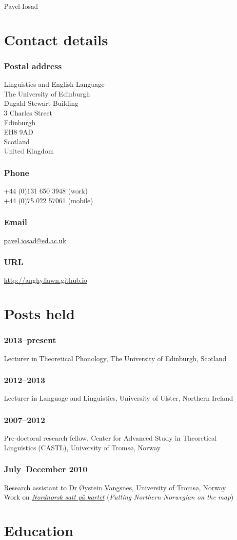 \documentclass[a4paper,11pt]{article}
\newlength\blockwidth
\newcommand\cvitem[1]{\hspace*{\blockwidth}\begin{minipage}[t]{\linewidth-\blockwidth}
#1
\end{minipage}\par}
\newcommand{\block}[2]{\subsubsection{#1}\cvitem{#2}}
\begin{document}
\thispagestyle{plain}
{\Huge Pavel Iosad}\\[\baselineskip]

\section{Contact details}

\raggedcolumns

\begin{multicols}{2}
\block{Postal address}{Linguistics and English Language\\
The University of Edinburgh\\
Dugald Stewart Building\\
3 Charles Street\\
Edinburgh\\
EH8 9AD\\
Scotland\\
United Kingdom}
\block{Phone}{+44 (0)131 650 3948 (work)\\
+44 (0)75 022 57061 (mobile)}
\block{Email}{\href{mailto:pavel.iosad@ed.ac.uk}{pavel.iosad@ed.ac.uk}}
\block{URL}{\href{http://anghyflawn.github.io}{http://anghyflawn.github.io}}
\end{multicols}

\section{Posts held}
\block{2013--present}{Lecturer in Theoretical Phonology, The University of Edinburgh, Scotland}
\block{2012--2013}{Lecturer in Language and Linguistics, University of Ulster, Northern Ireland}
\block{2007--2012}{Pre-doctoral research fellow, Center for Advanced Study in Theoretical Linguistics (CASTL), University of Tromsø, Norway}
\block{July--December 2010}{Research assistant to \href{http://www.hum.uit.no/a/vangsnes}{Dr Øystein Vangsnes}, University of Tromsø, Norway\\
Work on \href{http://nordnorsk.uit.no/}{\textit{Nordnorsk satt på kartet}} (\textit{Putting Northern Norwegian on the map})}

\section{Education}
\end{document}
